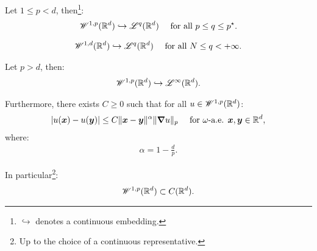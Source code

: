 \begin{corollary}
    Let $1 \leq p < d$, then\footnote{$\hookrightarrow$ denotes a continuous embedding.}:
    \begin{gather}
        \mathscr{W}^{1, p}(\mathbb{R}^{d}) \hookrightarrow \mathscr{L}^{q}(\mathbb{R}^{d}) \quad \text{ for all } p \leq q \leq p^{\star}.
    \end{gather}
\end{corollary}

\begin{corollary}
    \begin{gather}
        \mathscr{W}^{1, d}(\mathbb{R}^{d}) \hookrightarrow \mathscr{L}^{q}(\mathbb{R}^{d}) \quad \text{ for all } N \leq q < +\infty.
    \end{gather}
\end{corollary}

\begin{theorem}
    Let $p > d$, then:
    \begin{gather}
        \mathscr{W}^{1, p}(\mathbb{R}^{d}) \hookrightarrow \mathscr{L}^{\infty}(\mathbb{R}^{d}).
    \end{gather}

    Furthermore, there exists $C \geq 0$ such that for all $u \in \mathscr{W}^{1, p}(\mathbb{R}^{d})$:
    \begin{gather}
        \lvert u(\bm{x}) - u(\bm{y}) \rvert \leq C \lVert \bm{x} - \bm{y} \rVert^{\alpha} \lVert \bm{\nabla} u \rVert_p \quad \text{ for } \omega \text{-a.e. } \bm{x}, \bm{y} \in \mathbb{R}^{d},
    \end{gather}
    where:
    \begin{gather}
        \alpha = 1 - \frac{d}{p}.
    \end{gather}

    In particular\footnote{Up to the choice of a continuous representative.}:
    \begin{gather}
        \mathscr{W}^{1, p}(\mathbb{R}^{d}) \subset C(\mathbb{R}^{d}).
    \end{gather}
\end{theorem}

